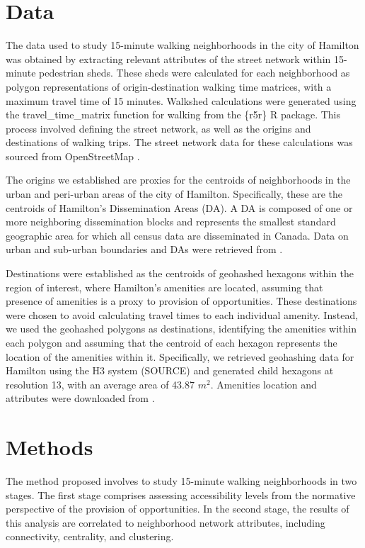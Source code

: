 \documentclass[preprint, 3p,
authoryear]{elsarticle} %
\begin{document}
\section{Data}\label{data}

The data used to study 15-minute walking neighborhoods in the city of
Hamilton was obtained by extracting relevant attributes of the street
network within 15-minute pedestrian sheds. These sheds were calculated
for each neighborhood as polygon representations of origin-destination
walking time matrices, with a maximum travel time of 15 minutes.
Walkshed calculations were generated using the travel\_time\_matrix
function for walking from the \{r5r\} R package. This process involved
defining the street network, as well as the origins and destinations of
walking trips. The street network data for these calculations was
sourced from OpenStreetMap \citet{OpenStreetMap2023}.

The origins we established are proxies for the centroids of
neighborhoods in the urban and peri-urban areas of the city of Hamilton.
Specifically, these are the centroids of Hamilton's Dissemination Areas
(DA). A DA is composed of one or more neighboring dissemination blocks
and represents the smallest standard geographic area for which all
census data are disseminated in Canada. Data on urban and sub-urban
boundaries and DAs were retrieved from \citet{HamiltonData2023}.

Destinations were established as the centroids of geohashed hexagons
within the region of interest, where Hamilton's amenities are located,
assuming that presence of amenities is a proxy to provision of
opportunities. These destinations were chosen to avoid calculating
travel times to each individual amenity. Instead, we used the geohashed
polygons as destinations, identifying the amenities within each polygon
and assuming that the centroid of each hexagon represents the location
of the amenities within it. Specifically, we retrieved geohashing data
for Hamilton using the H3 system (SOURCE) and generated child hexagons
at resolution 13, with an average area of 43.87 \(m^2\). Amenities
location and attributes were downloaded from \citet{OpenStreetMap2023}.

\section{Methods}\label{methods}

The method proposed involves to study 15-minute walking neighborhoods in
two stages. The first stage comprises assessing accessibility levels
from the normative perspective of the provision of opportunities. In the
second stage, the results of this analysis are correlated to
neighborhood network attributes, including connectivity, centrality, and
clustering.
\end{document}
